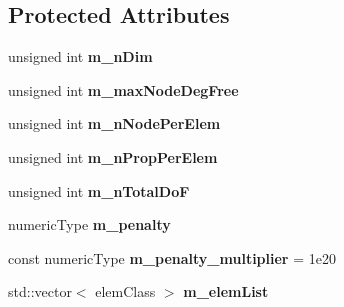\subsection*{Protected Attributes}
\begin{DoxyCompactItemize}
\item 
\mbox{\label{classbase_structural_analysis_class_ad40dbcb71e338b8cd998ad4bf80fef1a}} 
unsigned int {\bfseries m\+\_\+n\+Dim}
\item 
\mbox{\label{classbase_structural_analysis_class_af7ea30f9a3e3c353eeaba07c31c445a0}} 
unsigned int {\bfseries m\+\_\+max\+Node\+Deg\+Free}
\item 
\mbox{\label{classbase_structural_analysis_class_aed50959156544fc3d15af79eb38d6ae0}} 
unsigned int {\bfseries m\+\_\+n\+Node\+Per\+Elem}
\item 
\mbox{\label{classbase_structural_analysis_class_abec1d294a55c84f5ef8e227a69d4e5f4}} 
unsigned int {\bfseries m\+\_\+n\+Prop\+Per\+Elem}
\item 
\mbox{\label{classbase_structural_analysis_class_a9c1dbd7cb8a65f514211505672854330}} 
unsigned int {\bfseries m\+\_\+n\+Total\+DoF}
\item 
\mbox{\label{classbase_structural_analysis_class_a7e59de3567f891a9e6ea32378f0d7435}} 
numeric\+Type {\bfseries m\+\_\+penalty}
\item 
\mbox{\label{classbase_structural_analysis_class_a5366e9b75e98f8360ac90c72ea121dcd}} 
const numeric\+Type {\bfseries m\+\_\+penalty\+\_\+multiplier} = 1e20
\item 
\mbox{\label{classbase_structural_analysis_class_a80ad4a3ce359b44670321a7d4cefef58}} 
std\+::vector$<$ elem\+Class $>$ {\bfseries m\+\_\+elem\+List}
\item 
\mbox{\label{classbase_structural_analysis_class_a53cf915dc1fc9fcb8ff58b20bfac5632}} 

\end{DoxyCompactItemize}
